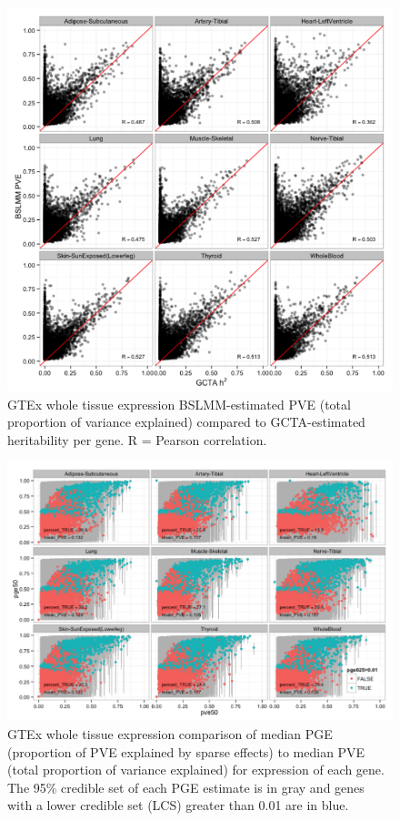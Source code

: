 \documentclass[]{article}
\begin{document}
\begin{figure}[htbp]
\centering
\includegraphics{GenArch_manuscript_files/figure-latex/TWpveh2-1.pdf}
\caption{GTEx whole tissue expression BSLMM-estimated PVE (total
proportion of variance explained) compared to GCTA-estimated
heritability per gene. R = Pearson correlation.}
\end{figure}

\begin{figure}[htbp]
\centering
\includegraphics{GenArch_manuscript_files/figure-latex/TWbslmm-1.pdf}
\caption{GTEx whole tissue expression comparison of median PGE
(proportion of PVE explained by sparse effects) to median PVE (total
proportion of variance explained) for expression of each gene. The 95\%
credible set of each PGE estimate is in gray and genes with a lower
credible set (LCS) greater than 0.01 are in blue.}
\end{figure}
\end{document}
